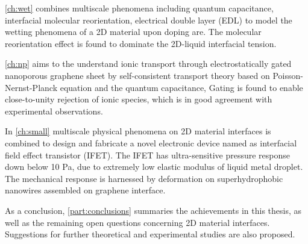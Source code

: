 \autoref{ch:wet} combines multiscale phenomena including quantum capacitance,
interfacial molecular reorientation, electrical double layer (EDL) to model
the wetting phenomena of a 2D material upon doping are. The
molecular reorientation effect is found to dominate the 2D-liquid
interfacial tension.
%

\autoref{ch:np} aims to the understand ionic transport through
electrostatically gated nano\-porous graphene sheet by
self-consistent transport theory based on Poisson-Nernst-Planck
equation and the quantum capacitance, Gating is found to enable
close-to-unity rejection of ionic species, which is in good agreement
with experimental observations.
%

In \autoref{ch:small} multiscale physical phenomena on 2D material
interfaces is combined to design and fabricate a novel electronic
device named as interfacial field effect transistor (IFET). The IFET
has ultra-sensitive pressure response down below 10 Pa, due to extremely
low elastic modulus of liquid metal droplet. The mechanical response
is harnessed by deformation on superhydrophobic nanowires assembled on
graphene interface.

As a conclusion, \autoref{part:conclusions} summaries the achievements
in this thesis, as well as the remaining open questions concerning 2D
material interfaces. Suggestions for further theoretical and
experimental studies are also proposed.


